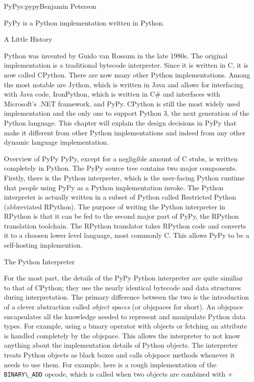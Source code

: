 \begin{aosachapter}{PyPy}{s:pypy}{Benjamin Peterson}

PyPy is a Python implementation written in Python.

\begin{aosasect1}{A Little History}

Python was invented by Guido van Rossum in the late 1980s. The original
implementation is a traditional bytecode interpreter. Since it is written in C,
it is now called CPython. There are now many other Python implementations. Among
the most notable are Jython, which is written in Java and allows for interfacing
with Java code, IronPython, which is written in C\# and interfaces with
Microsoft's .NET framework, and PyPy. CPython is still the most widely used
implementation and the only one to support Python 3, the next generation of the
Python language. This chapter will explain the design decisions in PyPy that
make it different from other Python implementations and indeed from any other
dynamic language implementation.

\end{aosasect1}

\begin{aosasect1}{Overview of PyPy}
PyPy, except for a negligible amount of C stubs, is written completely in
Python. The PyPy source tree contains two major components. Firstly, there is
the Python interpreter, which is the user-facing Python runtime that people
using PyPy as a Python implementation invoke. The Python interpreter is actually
written in a subset of Python called Restricted Python (abbreviated
RPython). The purpose of writing the Python interpreter in RPython is that it
can be fed to the second major part of PyPy, the RPython translation
toolchain. The RPython translator takes RPython code and converts it to a
choosen lower level language, most commonly C. This allows PyPy to be a
self-hosting implemention.

\end{aosasect1}

\begin{aosasect1}{The Python Interpreter}

For the most part, the details of the PyPy Python interpreter are quite similiar
to that of CPython; they use the nearly identical bytecode and data structures
during interpretation. The primary difference between the two is the
introduction of a clever abstraction called \emph{object spaces} (or objspaces
for short). An objspace encapsulates all the knowledge needed to represent and
manipulate Python data types. For example, using a binary operator with objects
or fetching an attribute is handled completely by the objspace. This allows the
interpreter to not know anything about the implementation details of Python
objects. The interpreter treats Python objects as black boxes and calls objspace
methods whenever it needs to use them. For example, here is a rough
implementation of the \verb+BINARY\_ADD+ opcode, which is called when two
objects are combined with +


\end{aosasect1}
\end{aosachapter}
